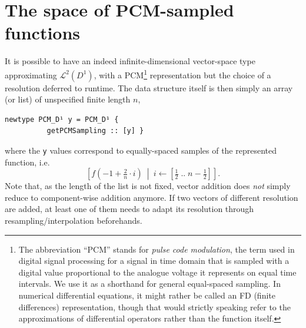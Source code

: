 \documentclass[final,sigplan,review,anonymous]{acmart}\settopmatter{printfolios=true,printccs=false,printacmref=false}
\theoremstyle{acmplain}
\theoremstyle{acmdefinition}
\begin{document}
\section{The space of PCM-sampled functions}
It is possible to have an indeed infinite-dimensional vector-space type approximating $\mathcal{L}^2(D^1)$, with a PCM\footnote{%
The abbreviation “PCM” stands for \emph{pulse code modulation}, the term used in digital signal processing for a signal in time domain that is sampled with a digital value proportional to the analogue voltage it represents on equal time intervals. We use it as a shorthand for general equal-spaced sampling. In numerical differential equations, it might rather be called an FD (finite differences) representation, though that would strictly speaking refer to the approximations of differential operators rather than the function itself.
} representation but the choice of a resolution deferred to runtime. The data structure itself is then simply an array (or list) of unspecified finite length $n$,
\begin{lstlisting}
newtype PCM_D¹ y = PCM_D¹ {
          getPCMSampling :: [y] }
\end{lstlisting}
where the \lstinline`y` values correspond to equally-spaced samples of the represented function, i.e.
\[
  \left[f(-1 + \tfrac2n\cdot i)\ \middle|\ i\leftarrow[\tfrac12\;..\;n-\tfrac12]\right].
\]
Note that, as the length of the list is not fixed,
vector addition does \emph{not} simply reduce to component-wise addition anymore. If two vectors of different resolution are added, at least one of them needs to adapt its resolution through resampling/interpolation beforehands.
\end{document}

